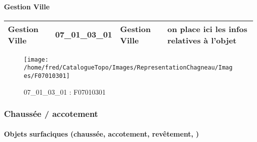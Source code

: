\documentclass[12pt,titlepage,oneside]{book}
\begin{document}
\paragraph{Gestion Ville}
\noindent
\vspace{\baselineskip}

\renewcommand{\arraystretch}{1.2}
\begin{supertabular}{|p{10cm}|c|p{13cm}|p{12cm}|}
 Gestion Ville & 07\_01\_03\_01 & Gestion Ville & on place ici les infos relatives à l'objet\\
\hline
\end{supertabular}
\begin{figure}[h!]
  \hfill         %
  \begin{minipage}[t]{3cm}
    \begin{center}
      \texttt{[image: /home/fred/CatalogueTopo/Images/RepresentationChagneau/Images/F07010301]}
      \caption[F07010301]{\label{} 07\_01\_03\_01 : F07010301}
    \end{center}
  \end{minipage}
\end{figure}

\subsubsection{\large Chaussée / accotement}
\paragraph{Objets surfaciques (chaussée, accotement, revêtement, )}
\noindent
\vspace{\baselineskip}
\end{document}
